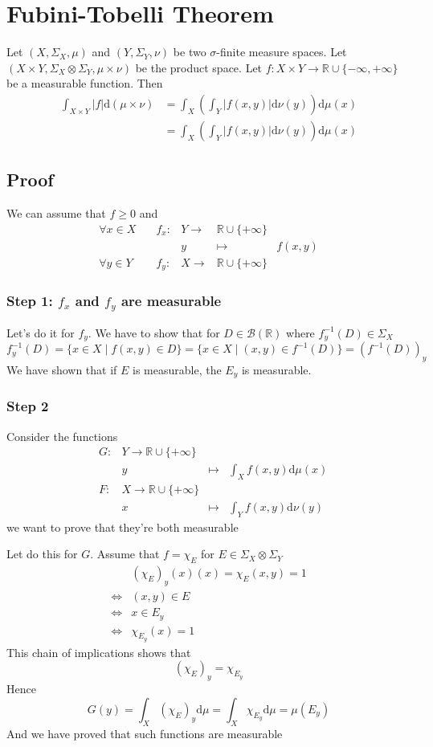 \documentclass{book}
\newcommand{\abs}[1]{\left\lvert #1 \right\rvert}
\begin{document}
\section{Fubini-Tobelli Theorem}
Let $(X,\Sigma_X,\mu)$ and $(Y,\Sigma_Y,\nu)$ be two $\sigma$-finite measure spaces. Let $(X\times Y,\Sigma_X\otimes\Sigma_Y,\mu\times\nu)$ be the product space. Let $f:X\times Y\rightarrow \mathbb{R}\cup\{-\infty,+\infty\}$ be a measurable function. Then 
$$\begin{aligned}
    \int_{X\times Y}\abs{f}\text{d}(\mu\times\nu) &=\int_X(\int_Y\abs{f(x,y)}\text{d}\nu(y))\text{d}\mu(x)\\
    &=\int_X(\int_Y\abs{f(x,y)}\text{d}\nu(y))\text{d}\mu(x)
\end{aligned}$$
\subsection*{Proof}
We can assume that $f\geq0$ and 
$$\begin{aligned}
    \forall x\in X\quad &f_x: &Y\rightarrow&\mathbb{R}\cup\{+\infty\}\\
    &&y&\mapsto&f(x,y)\\
    \forall y\in Y\quad &f_y: &X\rightarrow&\mathbb{R}\cup\{+\infty\}
\end{aligned}$$
\subsubsection{Step 1: $f_x$ and $f_y$ are measurable}
Let's do it for $f_y$. We have to show that for $D\in \mathscr{B}(\mathbb{R})$ where $f^{-1}_y(D)\in \Sigma_X$
$$f_y^{-1}(D)=\{x\in X\mid f(x,y)\in D\}=\{x\in X\mid(x,y)\in f^{-1}(D)\}=(f^{-1}(D))_y$$
We have shown that if $E$ is measurable, the $E_y$ is measurable.
\subsubsection{Step 2}
Consider the functions $$\begin{aligned}
    &G:&Y\rightarrow\mathbb{R}\cup\{+\infty\}\\
    &&y&\mapsto&\int_Xf(x,y)\text{d}\mu(x)\\
    &F:&X\rightarrow\mathbb{R}\cup\{+\infty\}\\
    &&x&\mapsto&\int_Yf(x,y)\text{d}\nu(y)
\end{aligned}$$
we want to prove that they're both measurable

Let do this for $G$. Assume that $f=\chi_E$ for $E\in \Sigma_X\otimes\Sigma_Y$
$$\begin{aligned}
&(\chi_E)_y(x)(x)=\chi_E(x,y)=1\\
\Leftrightarrow &(x,y)\in E\\
\Leftrightarrow &x\in E_y\\
\Leftrightarrow &\chi_{E_y}(x)=1
\end{aligned}$$
This chain of implications shows that $$(\chi_E)_y=\chi_{E_y}$$
Hence 
$$G(y)=\int_X(\chi_E)_y\text{d}\mu=\int_X\chi_{E_y}\text{d}\mu=\mu(E_y)$$
And we have proved that such functions are measurable
\end{document}
